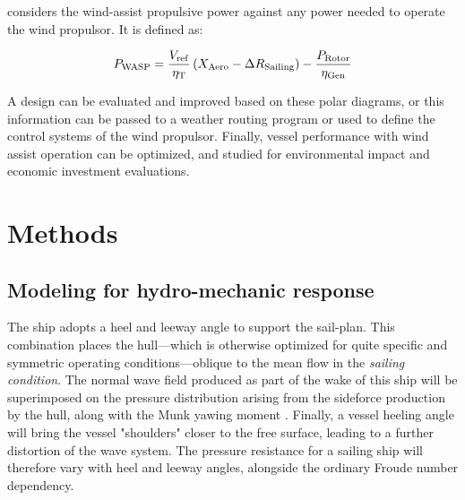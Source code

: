 \documentclass[twoside,twocolumn]{article}
\begin{document}
\PWASP considers the wind-assist propulsive power against any power needed to operate the wind propulsor. It is defined as:

\begin{equation}
P_{\mathrm{WASP}}=\frac{V_{\mathrm{ref}}}{\eta_{\mathrm{T}}} \left( X_{\mathrm{Aero}}-\Delta R_{\mathrm{Sailing}} \right) -\frac{P_{\mathrm{Rotor}}}{\eta_{\mathrm{Gen}}}
\label{eq:Pwasp}
\end{equation}

A design can be evaluated and improved based on these polar diagrams, or this information can be passed to a weather routing program or used to define the control systems of the wind propulsor. Finally, vessel performance with wind assist operation can be optimized, and studied for environmental impact and economic investment evaluations.

\section{Methods}

\subsection{Modeling for hydro-mechanic response}

The ship adopts a heel and leeway angle to support the sail-plan. This combination places the hull---which is otherwise optimized for quite specific and symmetric operating conditions---oblique to the mean flow in the \textit{sailing condition}. The normal wave field produced as part of the wake of this ship will be superimposed on the pressure distribution arising from the sideforce production by the hull, along with the Munk yawing moment \cite{Munk1924}. Finally, a vessel heeling angle will bring the vessel "shoulders" closer to the free surface, leading to a further distortion of the wave system. The pressure resistance for a sailing ship will therefore vary with heel and leeway angles, alongside the ordinary Froude number dependency.
\end{document}
